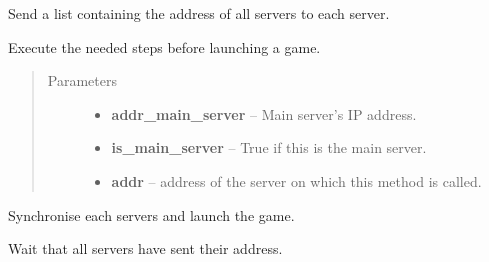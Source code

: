 \documentclass[letterpaper,10pt,english]{sphinxmanual}
\begin{document}
\begin{fulllineitems}
\begin{fulllineitems}
\end{fulllineitems}


\begin{fulllineitems}
\label{api:game.GameManagement.send_list_servers}
Send a list containing the address of all
servers to each server.

\end{fulllineitems}


\begin{fulllineitems}
\label{api:game.GameManagement.start}
Execute the needed steps before launching a game.
\begin{quote}\begin{description}
\item[{Parameters}] \leavevmode\begin{itemize}
\item {} 
\textbf{addr\_main\_server} -- Main server's IP address.

\item {} 
\textbf{is\_main\_server} -- True if this is the main server.

\item {} 
\textbf{addr} -- address of the server on which this method is called.

\end{itemize}

\end{description}\end{quote}

\end{fulllineitems}


\begin{fulllineitems}
\label{api:game.GameManagement.synchronise_servers}
Synchronise each servers and launch the game.

\end{fulllineitems}


\begin{fulllineitems}
\label{api:game.GameManagement.wait_addr_servers}
Wait that all servers have sent their address.


\end{fulllineitems}
\end{fulllineitems}
\end{document}
